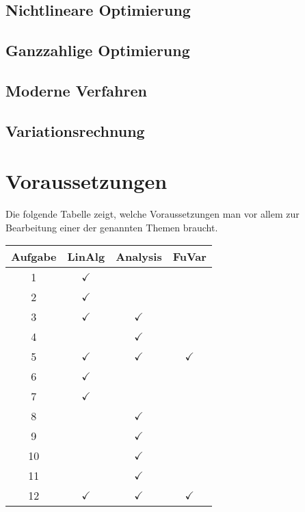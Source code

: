 \documentclass[a4paper,12pt]{article}
\begin{document}
\subsection{Nichtlineare Optimierung}




\subsection{Ganzzahlige Optimierung}


\subsection{Moderne Verfahren}





\subsection{Variationsrechnung}


\section{Voraussetzungen}
Die folgende Tabelle zeigt, welche Voraussetzungen man vor allem
zur Bearbeitung einer der genannten Themen braucht.
\begin{center}
\begin{tabular}{|c|c|c|c|}
\hline
Aufgabe&LinAlg&Analysis&FuVar\\
\hline
 1&$\checkmark$&            &            \\
 2&$\checkmark$&            &            \\
 3&$\checkmark$&$\checkmark$&            \\
 4&            &$\checkmark$&            \\
 5&$\checkmark$&$\checkmark$&$\checkmark$\\
 6&$\checkmark$&            &            \\
 7&$\checkmark$&            &            \\
 8&            &$\checkmark$&            \\
 9&            &$\checkmark$&            \\
10&            &$\checkmark$&            \\
11&            &$\checkmark$&            \\
12&$\checkmark$&$\checkmark$&$\checkmark$\\
\hline
\end{tabular}
\end{center}
\end{document}
